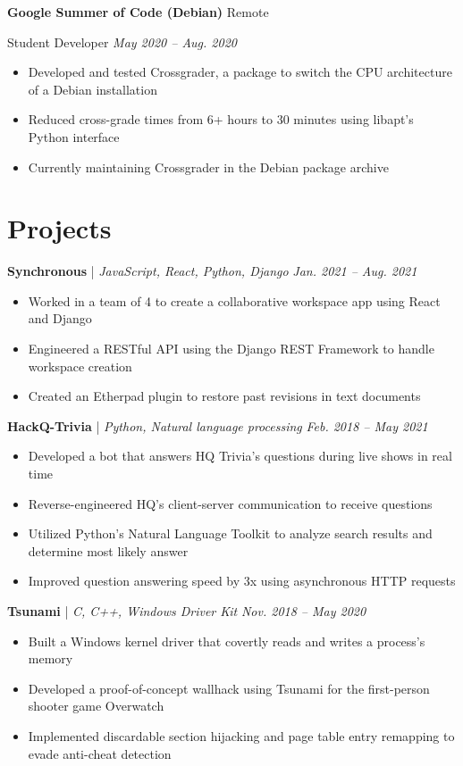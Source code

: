 \documentclass[11pt,letterpaper]{article}
\newcommand{\resumeItemListStart}{
    \begin{itemize}[itemsep=1pt, parsep=0pt, topsep=0pt]
}
\newcommand{\resumeItemListEnd}{
    \end{itemize}
}
\begin{document}
\textbf{Google Summer of Code (Debian)} \hfill Remote

Student Developer \hfill \textit{May 2020 -- Aug. 2020}

\resumeItemListStart
	\item Developed and tested Crossgrader, a package to switch the CPU architecture of a Debian installation
	\item Reduced cross-grade times from 6+ hours to 30 minutes using libapt's Python interface
    \item Currently maintaining Crossgrader in the Debian package archive
\resumeItemListEnd

\section{Projects}

\textbf{Synchronous} | \emph{JavaScript, React, Python, Django} \hfill \textit{Jan. 2021 -- Aug. 2021}

\resumeItemListStart
    \item Worked in a team of 4 to create a collaborative workspace app using React and Django
    \item Engineered a RESTful API using the Django REST Framework to handle workspace creation
    \item Created an Etherpad plugin to restore past revisions in text documents
\resumeItemListEnd

\textbf{HackQ-Trivia} | \emph{Python, Natural language processing} \hfill \textit{Feb. 2018 -- May 2021}

\resumeItemListStart
    \item Developed a bot that answers HQ Trivia's questions during live shows in real time
	\item Reverse-engineered HQ's client-server communication to receive questions
	\item Utilized Python's Natural Language Toolkit to analyze search results and determine most likely answer
	\item Improved question answering speed by 3x using asynchronous HTTP requests
\resumeItemListEnd

\textbf{Tsunami} | \emph{C, C++, Windows Driver Kit} \hfill \textit {Nov. 2018 -- May 2020}

\resumeItemListStart
    \item Built a Windows kernel driver that covertly reads and writes a process's memory
    \item Developed a proof-of-concept wallhack using Tsunami for the first-person shooter game Overwatch
	\item Implemented discardable section hijacking and page table entry remapping to evade anti-cheat detection
\resumeItemListEnd
\end{document}
